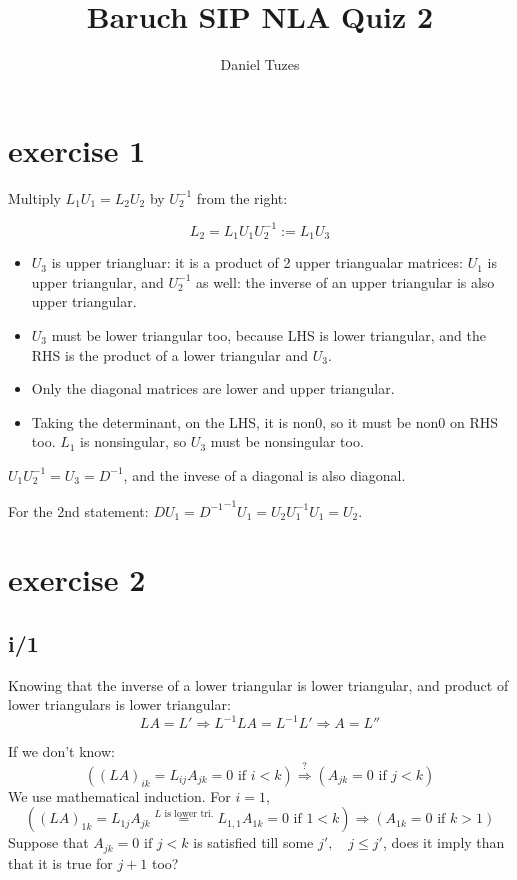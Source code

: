 \documentclass{article}
\title{Baruch SIP NLA Quiz 2}
\author{Daniel Tuzes}
\begin{document}
\maketitle

\section{exercise 1}
Multiply $L_1 U_1 = L_2 U_2$ by $U_2^{-1}$ from the right:

$$L_2 = L_1 U_1 U_2^{-1} := L_1 U_3$$

\begin{itemize}
    \item $U_3$ is upper triangluar: it is a product of 2 upper triangualar matrices: $U_1$ is upper triangular, and $U_2^{-1}$ as well: the inverse of an upper triangular is also upper triangular.
    \item $U_3$ must be lower triangular too, because LHS is lower triangular, and the RHS is the product of a lower triangular and $U_3$.
    \item Only the diagonal matrices are lower and upper triangular.
    \item Taking the determinant, on the LHS, it is non0, so it must be non0 on RHS too. $L_1$ is nonsingular, so $U_3$ must be nonsingular too.
\end{itemize}
$U_1 U_2^{-1} = U_3 = D^{-1}$, and the invese of a diagonal is also diagonal.

For the 2nd statement: $D U_1 = {D^{-1}}^{-1} U_1 = U_2 U_1^{-1} U_1 = U_2$.

\section{exercise 2}
\subsection{i/1}
Knowing that the inverse of a lower triangular is lower triangular, and product of lower triangulars is lower triangular:
\[LA = L' \Rightarrow {L^{ - 1}}LA = {L^{ - 1}}L' \Rightarrow A = L''\]

If we don't know:
\[\left( {{{\left( {LA} \right)}_{ik}} = {L_{ij}}{A_{jk}} = 0{\text{ if }}i < k} \right)\mathop  \Rightarrow \limits^? \left( {{A_{jk}} = 0{\text{ if }}j < k} \right)\]
We use mathematical induction. For $i=1$,
\[\left( {{{\left( {LA} \right)}_{1k}} = {L_{1j}}{A_{jk}}\mathop  = \limits^{L{\text{ is lower tri}}{\text{.}}} {L_{1,1}}{A_{1k}} = 0{\text{ if }}1 < k} \right) \Rightarrow \left( {A_{1k}} = 0{\text{ if }}k > 1\right)\]
Suppose that $A_{jk}=0 \text{ if }j<k$ is satisfied till some $j',\quad j\le j'$, does it imply than that it is true for $j+1$ too?
\end{document}
